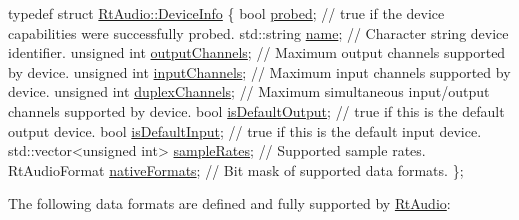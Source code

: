\begin{DoxyCode}
\textcolor{keyword}{typedef} \textcolor{keyword}{struct }\hyperlink{struct_rt_audio_1_1_device_info}{RtAudio::DeviceInfo} \{
  \textcolor{keywordtype}{bool} \hyperlink{struct_rt_audio_1_1_device_info_a97573717ccb1e75a834a0a108cd6982d}{probed};                           \textcolor{comment}{// true if the device capabilities were successfully probed.}
  std::string \hyperlink{struct_rt_audio_1_1_device_info_a24df596ab8d54f2eb540c7cf16212b3b}{name};                      \textcolor{comment}{// Character string device identifier.}
  \textcolor{keywordtype}{unsigned} \textcolor{keywordtype}{int} \hyperlink{struct_rt_audio_1_1_device_info_a81aaf488f8158ef55b1bb678f66feb7d}{outputChannels};           \textcolor{comment}{// Maximum output channels supported by device.}
  \textcolor{keywordtype}{unsigned} \textcolor{keywordtype}{int} \hyperlink{struct_rt_audio_1_1_device_info_a56247b458a937ae84d98ca9c4b243275}{inputChannels};            \textcolor{comment}{// Maximum input channels supported by device.}
  \textcolor{keywordtype}{unsigned} \textcolor{keywordtype}{int} \hyperlink{struct_rt_audio_1_1_device_info_a3e8ad34c2d14e24293a0beafc26186e7}{duplexChannels};           \textcolor{comment}{// Maximum simultaneous input/output channels
       supported by device.}
  \textcolor{keywordtype}{bool} \hyperlink{struct_rt_audio_1_1_device_info_a5365245e73ffe29a05734de4474acd58}{isDefaultOutput};                  \textcolor{comment}{// true if this is the default output device.}
  \textcolor{keywordtype}{bool} \hyperlink{struct_rt_audio_1_1_device_info_a7c8aca084bd908799b6be5954b80def2}{isDefaultInput};                   \textcolor{comment}{// true if this is the default input device.}
  std::vector<unsigned int> \hyperlink{struct_rt_audio_1_1_device_info_afa65f5f92f66ce7aacd3ff35e11b230f}{sampleRates}; \textcolor{comment}{// Supported sample rates.}
  RtAudioFormat \hyperlink{struct_rt_audio_1_1_device_info_a23251b549b89b2fe04a57fcd7cb76ea4}{nativeFormats};           \textcolor{comment}{// Bit mask of supported data formats.}
\};
\end{DoxyCode}


The following data formats are defined and fully supported by \hyperlink{class_rt_audio}{Rt\+Audio}\+:


